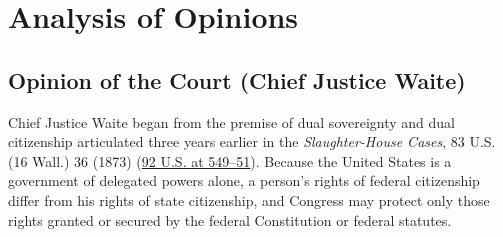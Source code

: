 \documentclass[12pt]{article}
\begin{document}
\section{Analysis of Opinions}

\subsection{Opinion of the Court (Chief Justice Waite)}

Chief Justice Waite began from the premise of dual sovereignty and dual citizenship articulated three years earlier in the \textit{Slaughter-House Cases}, 83 U.S. (16 Wall.) 36 (1873) (\href{https://supreme.justia.com/cases/federal/us/92/542/}{92 U.S. at 549--51}). Because the United States is a government of delegated powers alone, a person's rights of federal citizenship differ from his rights of state citizenship, and Congress may protect only those rights granted or secured by the federal Constitution or federal statutes.
\end{document}
